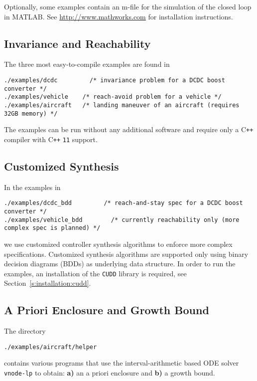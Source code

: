 \documentclass[a4paper]{amsart}
\newcommand\Cpp{C\texttt{++} }
\begin{document}
Optionally, some examples contain an m-file for the simulation of the
closed loop in MATLAB. See \url{http://www.mathworks.com} for installation
instructions.


\subsection{Invariance and Reachability}

The three most easy-to-compile examples are found in
\begin{lstlisting}[basicstyle=\small\ttfamily]
./examples/dcdc      	/* invariance problem for a DCDC boost converter */ 
./examples/vehicle    /* reach-avoid problem for a vehicle */ 
./examples/aircraft   /* landing maneuver of an aircraft (requires 32GB memory) */ 
\end{lstlisting}
The examples can be run without any additional software and require only a
\Cpp compiler with \Cpp{\tt11} support. 

\subsection{Customized Synthesis} In the examples in
\begin{lstlisting}[basicstyle=\small\ttfamily]
./examples/dcdc_bdd        	/* reach-and-stay spec for a DCDC boost converter */ 
./examples/vehicle_bdd  	  /* currently reachability only (more complex spec is planned) */ 
\end{lstlisting}
we use customized controller synthesis algorithms to enforce more complex
specifications. Customized synthesis algorithms are supported only 
using binary decision diagrams (BDDs) as underlying data structure.  In order to run the examples, an
installation of the 
{\tt CUDD} library is required, see Section~\ref{s:installation:cudd}.


\subsection{A Priori Enclosure and Growth Bound}
The directory 
\begin{lstlisting}[basicstyle=\small\ttfamily]
./examples/aircraft/helper        	
\end{lstlisting}
contains various programs that 
use the interval-arithmetic based ODE solver {\tt vnode-lp} to obtain:
{\bf a)} an a priori enclosure and {\bf b)} a growth
bound.
\end{document}

